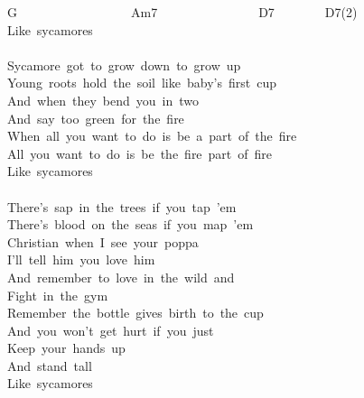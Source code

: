 {G\ \ \ \ \ \ \ \ \ \ \ \ \ \ \ \ \ \ Am7\ \ \ \ \ \ \ \ \ \ \ \ \ \ \ \ D7\ \ \ \ \ \ \ \ D7(2)\ \ \ \ \\
Like\ sycamores\\
\ \ \ \ \ \ \ \ \ \ \ \ \ \ \ \ \ \ \ \\
Sycamore\ got\ to\ grow\ down\ to\ grow\ up\\
Young\ roots\ hold\ the\ soil\ like\ baby's\ first\ cup\\
And\ when\ they\ bend\ you\ in\ two\\
And\ say\ too\ green\ for\ the\ fire\\
When\ all\ you\ want\ to\ do\ is\ be\ a\ part\ of\ the\ fire\\
All\ you\ want\ to\ do\ is\ be\ the\ fire\ part\ of\ fire\\
Like\ sycamores\\
\\
There's\ sap\ in\ the\ trees\ if\ you\ tap\ 'em\\
There's\ blood\ on\ the\ seas\ if\ you\ map\ 'em\\
Christian\ when\ I\ see\ your\ poppa\\
I'll\ tell\ him\ you\ love\ him\\
And\ remember\ to\ love\ in\ the\ wild\ and\\
Fight\ in\ the\ gym\\
Remember\ the\ bottle\ gives\ birth\ to\ the\ cup\\
And\ you\ won't\ get\ hurt\ if\ you\ just\\
Keep\ your\ hands\ up\\
And\ stand\ tall\\
Like\ sycamores}
